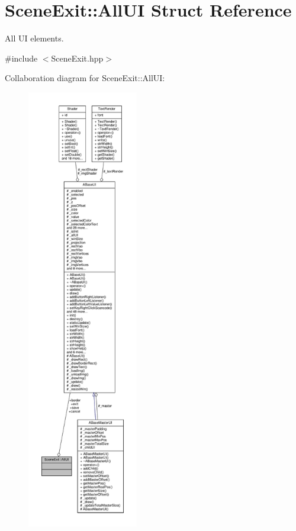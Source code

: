 \hypertarget{struct_scene_exit_1_1_all_u_i}{}\section{Scene\+Exit\+:\+:All\+UI Struct Reference}
\label{struct_scene_exit_1_1_all_u_i}


All UI elements.  




{\ttfamily \#include $<$Scene\+Exit.\+hpp$>$}



Collaboration diagram for Scene\+Exit\+:\+:All\+UI\+:
\nopagebreak
\begin{figure}[H]
\begin{center}
\leavevmode
\includegraphics[height=550pt]{struct_scene_exit_1_1_all_u_i__coll__graph}
\end{center}
\end{figure}
